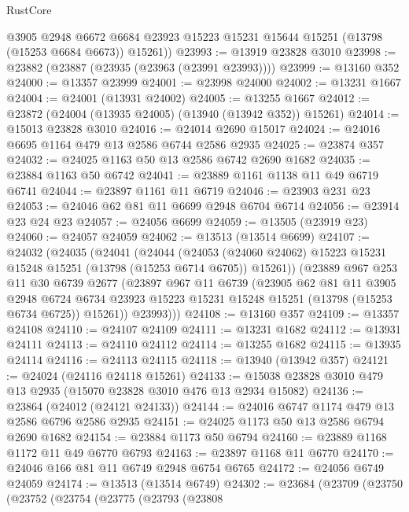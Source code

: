 \begin{lexlean}{RustCore}
\begin{coremodule}
        @3905
        @2948
        @6672
        @6684
        @23923
        @15223
        @15231
        @15644
        @15251
        (@13798 (@15253 @6684 @6673))
        @15261))
@23993 := @13919 @23828 @3010
@23998 := @23882 (@23887 (@23935 (@23963 (@23991 @23993))))
@23999 := @13160 @352
@24000 := @13357 @23999
@24001 := @23998 @24000
@24002 := @13231 @1667
@24004 := @24001 (@13931 @24002)
@24005 := @13255 @1667
@24012 := @23872 (@24004 (@13935 @24005) (@13940 (@13942 @352)) @15261)
@24014 := @15013 @23828 @3010
@24016 := @24014 @2690 @15017
@24024 := @24016 @6695 @1164 @479 @13 @2586 @6744 @2586 @2935
@24025 := @23874 @357
@24032 := @24025 @1163 @50 @13 @2586 @6742 @2690 @1682
@24035 := @23884 @1163 @50 @6742
@24041 := @23889 @1161 @1138 @11 @49 @6719 @6741
@24044 := @23897 @1161 @11 @6719
@24046 := @23903 @231 @23
@24053 := @24046 @62 @81 @11 @6699 @2948 @6704 @6714
@24056 := @23914 @23 @24 @23
@24057 := @24056 @6699
@24059 := @13505 (@23919 @23)
@24060 := @24057 @24059
@24062 := @13513 (@13514 @6699)
@24107 := @24032
    (@24035
      (@24041
        (@24044
          (@24053 (@24060 @24062) @15223 @15231 @15248 @15251 (@13798 (@15253 @6714 @6705)) @15261))
        (@23889
          @967
          @253
          @11
          @30
          @6739
          @2677
          (@23897
            @967
            @11
            @6739
            (@23905
              @62
              @81
              @11
              @3905
              @2948
              @6724
              @6734
              @23923
              @15223
              @15231
              @15248
              @15251
              (@13798 (@15253 @6734 @6725))
              @15261))
          @23993)))
@24108 := @13160 @357
@24109 := @13357 @24108
@24110 := @24107 @24109
@24111 := @13231 @1682
@24112 := @13931 @24111
@24113 := @24110 @24112
@24114 := @13255 @1682
@24115 := @13935 @24114
@24116 := @24113 @24115
@24118 := @13940 (@13942 @357)
@24121 := @24024 (@24116 @24118 @15261)
@24133 := @15038 @23828 @3010 @479 @13 @2935 (@15070 @23828 @3010 @476 @13 @2934 @15082)
@24136 := @23864 (@24012 (@24121 @24133))
@24144 := @24016 @6747 @1174 @479 @13 @2586 @6796 @2586 @2935
@24151 := @24025 @1173 @50 @13 @2586 @6794 @2690 @1682
@24154 := @23884 @1173 @50 @6794
@24160 := @23889 @1168 @1172 @11 @49 @6770 @6793
@24163 := @23897 @1168 @11 @6770
@24170 := @24046 @166 @81 @11 @6749 @2948 @6754 @6765
@24172 := @24056 @6749 @24059
@24174 := @13513 (@13514 @6749)
@24302 := @23684
    (@23709
      (@23750
        (@23752
          (@23754
            (@23775
              (@23793
                (@23808

\end{coremodule}
\end{lexlean}
